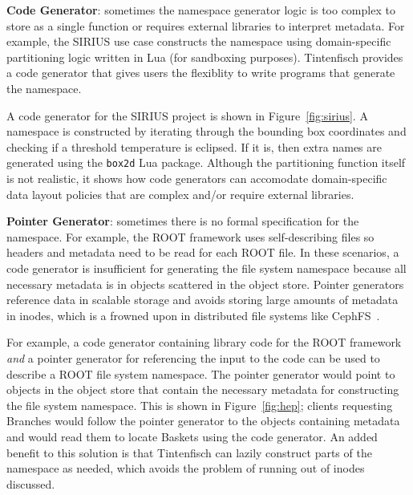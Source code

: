 
\textbf{Code Generator}: sometimes the namespace generator logic is too complex to store as a single
function or requires external libraries to interpret metadata. For example, the
SIRIUS use case constructs the namespace using domain-specific partitioning
logic written in Lua (for sandboxing purposes).  Tintenfisch provides a code
generator that gives users the flexiblity to write programs that generate the
namespace.

A code generator for the SIRIUS project is shown in Figure~\ref{fig:sirius}.  A
namespace is constructed by iterating through the bounding box coordinates and
checking if a threshold temperature is eclipsed. If it is, then extra names
are generated using the \texttt{box2d} Lua package.  Although the partitioning
function itself is not realistic, it shows how code generators can accomodate
domain-specific data layout policies that are complex and/or require external
libraries.  

\textbf{Pointer Generator}: sometimes there is no formal specification for the
namespace. For example, the ROOT framework uses self-describing files so
headers and metadata need to be read for each ROOT file. In these scenarios, a
code generator is insufficient for generating the file system namespace because
all necessary metadata is in objects scattered in the object store. Pointer
generators reference data in scalable storage and avoids storing large amounts
of metadata in inodes, which is a frowned upon in distributed file systems like
CephFS~\cite{docs:cephinternals}.

For example, a code generator containing library code for the ROOT framework
\emph{and} a pointer generator for referencing the input to the code can be
used to describe a ROOT file system namespace. The pointer generator would
point to objects in the object store that contain the necessary metadata for
constructing the file system namespace. This is shown in Figure~\ref{fig:hep};
clients requesting Branches would follow the pointer generator to the objects
containing metadata and would read them to locate Baskets using the code
generator. An added benefit to this solution is that Tintenfisch can lazily
construct parts of the namespace as needed, which avoids the problem of running
out of inodes discussed.

